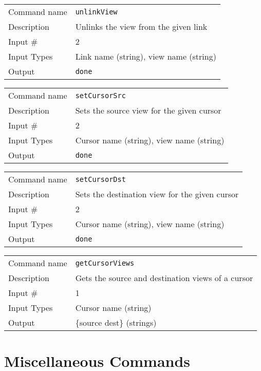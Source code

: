 \bigskip

\noindent
\begin{tabular}{l|p{5in}}
\hline
Command name & {\tt unlinkView} \\
Description  & Unlinks the view from the given link \\
Input \#     & 2 \\
Input Types  & Link name (string), view name (string) \\
Output       & {\tt done} \\
\hline
\end{tabular}

\bigskip

\noindent
\begin{tabular}{l|p{5in}}
\hline
Command name & {\tt setCursorSrc} \\
Description  & Sets the source view for the given cursor \\
Input \#     & 2 \\
Input Types  & Cursor name (string), view name (string) \\
Output       & {\tt done} \\
\hline
\end{tabular}

\bigskip

\noindent
\begin{tabular}{l|p{5in}}
\hline
Command name & {\tt setCursorDst} \\
Description  & Sets the destination view for the given cursor \\
Input \#     & 2 \\
Input Types  & Cursor name (string), view name (string) \\
Output       & {\tt done} \\
\hline
\end{tabular}

\bigskip

\noindent
\begin{tabular}{l|p{5in}}
\hline
Command name & {\tt getCursorViews} \\
Description  & Gets the source and destination views of a cursor \\
Input \#     & 1 \\
Input Types  & Cursor name (string) \\
Output       & \{source dest\} (strings) \\
\hline
\end{tabular}

\section{Miscellaneous Commands}

